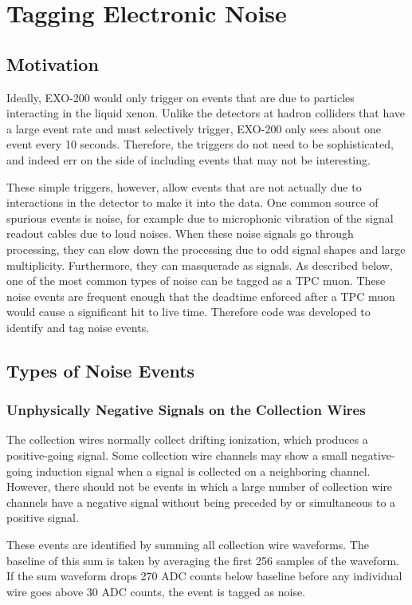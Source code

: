 \documentclass[herrin-thesis.tex]{subfiles}
\begin{document}
\chapter{Tagging Electronic Noise}
\label{app:noisetagger}

\section{Motivation}
Ideally, EXO-200 would only trigger on events that are due to particles interacting in the liquid xenon. Unlike the detectors at hadron colliders that have a large event rate and must selectively trigger, EXO-200 only sees about one event every 10 seconds. Therefore, the triggers do not need to be sophisticated, and indeed err on the side of including events that may not be interesting.

These simple triggers, however, allow events that are not actually due to interactions in the detector to make it into the data. One common source of spurious events is noise, for example due to microphonic vibration of the signal readout cables due to loud noises. When these noise signals go through processing, they can slow down the processing due to odd signal shapes and large multiplicity. Furthermore, they can masquerade as signals. As described below, one of the most common types of noise can be tagged as a TPC muon. These noise events are frequent enough that the deadtime enforced after a TPC muon would cause a significant hit to live time. Therefore code was developed to identify and tag noise events.

\section{Types of Noise Events}
\subsection{Unphysically Negative Signals on the Collection Wires}
The collection wires normally collect drifting ionization, which produces a positive-going signal. Some collection wire channels may show a small negative-going induction signal when a signal is collected on a neighboring channel. However, there should not be events in which a large number of collection wire channels have a negative signal without being preceded by or simultaneous to a positive signal.

These events are identified by summing all collection wire waveforms. The baseline of this sum is taken by averaging the first 256 samples of the waveform. If the sum waveform drops 270 ADC counts below baseline before any individual wire goes above 30 ADC counts, the event is tagged as noise.
\end{document}
